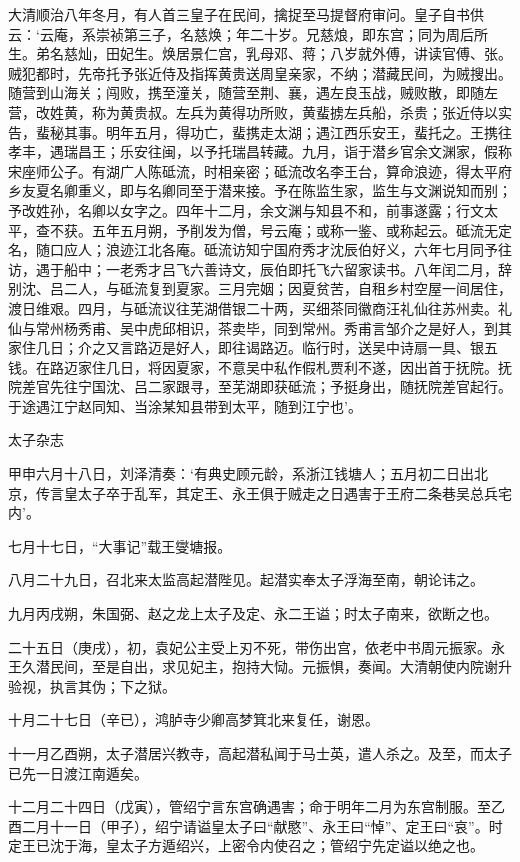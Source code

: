 \documentclass[]{article}
\begin{document}
大清顺治八年冬月，有人首三皇子在民间，擒捉至马提督府审问。皇子自书供云：`云庵，系崇祯第三子，名慈焕；年二十岁。兄慈烺，即东宫；同为周后所生。弟名慈灿，田妃生。焕居景仁宫，乳母邓、蒋；八岁就外傅，讲读官傅、张。贼犯都时，先帝托予张近侍及指挥黄贵送周皇亲家，不纳；潜藏民间，为贼搜出。随营到山海关；闯败，携至潼关，随营至荆、襄，遇左良玉战，贼败散，即随左营，改姓黄，称为黄贵叔。左兵为黄得功所败，黄蜚掳左兵船，杀贵；张近侍以实告，蜚秘其事。明年五月，得功亡，蜚携走太湖；遇江西乐安王，蜚托之。王携往孝丰，遇瑞昌王；乐安往闽，以予托瑞昌转藏。九月，诣于潜乡官余文渊家，假称宋座师公子。有湖广人陈砥流，时相亲密；砥流改名李王台，算命浪迹，得太平府乡友夏名卿重义，即与名卿同至于潜来接。予在陈监生家，监生与文渊说知而别；予改姓孙，名卿以女字之。四年十二月，余文渊与知县不和，前事遂露；行文太平，查不获。五年五月朔，予削发为僧，号云庵；或称一鉴、或称起云。砥流无定名，随口应人；浪迹江北各庵。砥流访知宁国府秀才沈辰伯好义，六年七月同予往访，遇于船中；一老秀才吕飞六善诗文，辰伯即托飞六留家读书。八年闰二月，辞别沈、吕二人，与砥流复到夏家。三月完姻；因夏贫苦，自租乡村空屋一间居住，渡日维艰。四月，与砥流议往芜湖借银二十两，买细茶同徽商汪礼仙往苏州卖。礼仙与常州杨秀甫、吴中虎邱相识，茶卖毕，同到常州。秀甫言邹介之是好人，到其家住几日；介之又言路迈是好人，即往谒路迈。临行时，送吴中诗扇一具、银五钱。在路迈家住几日，将因夏家，不意吴中私作假札贾利不遂，因出首于抚院。抚院差官先往宁国沈、吕二家跟寻，至芜湖即获砥流；予挺身出，随抚院差官起行。于途遇江宁赵同知、当涂某知县带到太平，随到江宁也'。

太子杂志

甲申六月十八日，刘泽清奏：`有典史顾元龄，系浙江钱塘人；五月初二日出北京，传言皇太子卒于乱军，其定王、永王俱于贼走之日遇害于王府二条巷吴总兵宅内'。

七月十七日，``大事记''载王燮塘报。

八月二十九日，召北来太监高起潜陛见。起潜实奉太子浮海至南，朝论讳之。

九月丙戌朔，朱国弼、赵之龙上太子及定、永二王谥；时太子南来，欲断之也。

二十五日（庚戌），初，袁妃公主受上刃不死，带伤出宫，依老中书周元振家。永王久潜民间，至是自出，求见妃主，抱持大恸。元振惧，奏闻。大清朝使内院谢升验视，执言其伪；下之狱。

十月二十七日（辛已），鸿胪寺少卿高梦箕北来复任，谢恩。

十一月乙酉朔，太子潜居兴教寺，高起潜私闻于马士英，遣人杀之。及至，而太子已先一日渡江南遁矣。

十二月二十四日（戊寅），管绍宁言东宫确遇害；命于明年二月为东宫制服。至乙酉二月十一日（甲子），绍宁请谥皇太子曰``献愍''、永王曰``悼''、定王曰``哀''。时定王已沈于海，皇太子方遁绍兴，上密令内使召之；管绍宁先定谥以绝之也。
\end{document}

